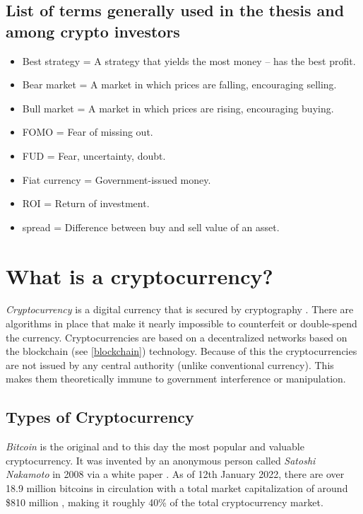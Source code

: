 \subsection*{List of terms generally used in the thesis and among crypto investors}
\begin{itemize}
    \item Best strategy = A strategy that yields the most money -- has the best profit.
    \item Bear market = A market in which prices are falling, encouraging selling. 
    \item Bull market = A market in which prices are rising, encouraging buying.
    \item FOMO = Fear of missing out.
    \item FUD = Fear, uncertainty, doubt.
    \item Fiat currency = Government-issued money.
    \item ROI = Return of investment.
    \item spread = Difference between buy and sell value of an asset.
\end{itemize}

\section{What is a cryptocurrency?}
\emph{Cryptocurrency} is a digital currency that is secured by cryptography \cite{investopedia-cryptocurrency}. There are algorithms in place that make it nearly impossible to counterfeit or double-spend the currency. Cryptocurrencies are based on a decentralized networks based on the blockchain (see \ref{blockchain}) technology. Because of this the cryptocurrencies are not issued by any central authority (unlike conventional currency). This makes them theoretically immune to government interference or manipulation.

\subsection*{Types of Cryptocurrency}
\emph{Bitcoin} is the original and to this day the most popular and valuable cryptocurrency. It was invented by an anonymous person called \emph{Satoshi Nakamoto} in 2008 via a white paper \cite{satoshi}. As of 12th January 2022, there are over 18.9 million bitcoins in circulation with a total market capitalization of around \$810 million \cite{coinmarketcap}, making it roughly 40\% of the total cryptocurrency market.

